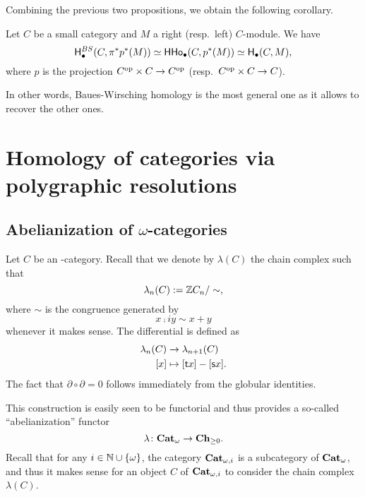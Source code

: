 \documentclass{amsart}
\newcommand{\M}{\mathcal{M}}
\newcommand{\B}{\mathcal{B}}
\newcommand{\Tw}[1]{\mathrm{Tw}(#1)}
\newcommand{\HHo}{\mathsf{HHo}}
\renewcommand{\sce}[1]{\source{} #1}
\renewcommand{\tge}[1]{\target{} #1}
\begin{document}
Combining the previous two propositions, we obtain the following corollary.
\begin{corollary}
  Let $C$ be a small category and $M$ a right (resp.\ left)
  $C$\nbd-module. We have
  \[
    \Ho^{BS}_{\bullet}(C,\pi^*p^*(M))\simeq \HHo_{\bullet}(C,p^*(M))\simeq \Ho_{\bullet}(C,M),
  \]
  where $p$ is the projection $C^{{\mathrm{op}}}\times C \to C^{{\mathrm{op}}}$ (resp.\
  $C^{{\mathrm{op}}}\times C \to C$).
\end{corollary}
In other words, Baues-Wirsching homology is the most general one as
it allows to recover the other ones.
\section{Homology of categories via polygraphic resolutions}
\subsection{Abelianization of $\omega$-categories}
\begin{paragr}
  Let $C$ be an \oo\nbd-category. Recall that we denote by
  $\lambda(C)$ the chain complex such that
  \[
    \lambda_n(C):=\mathbb Z C_n/\sim,
  \]
  where $\sim$ is the congruence generated by
  \[
    x \comp{i} y \sim x + y
  \]
  whenever it makes sense. The differential is defined as
  \[
    \begin{aligned}
      \lambda_{n}(C) &\to \lambda_{n+1}(C)\\
      [x] &\mapsto [\tge{x}]-[\sce{x}].
    \end{aligned}
  \]
  The fact that $\partial \circ \partial=0$ follows immediately from
  the globular identities.

  This construction is easily seen to be functorial and thus provides
  a so-called ``abelianization'' functor
  \[
    \lambda \colon \mathbf{Cat}_{\omega} \to \mathbf{Ch}_{\geq 0}.
  \]
  Recall that for any $i \in \mathbb N\cup \left\{\omega\right\}$, the category
  $\mathbf{Cat}_{\omega,i}$ is a subcategory of $\mathbf{Cat}_{\omega}$, and thus it makes sense for
  an object $C$ of $\mathbf{Cat}_{\omega,i}$ to consider the chain complex
  $\lambda(C)$.
\end{paragr}
\end{document}
